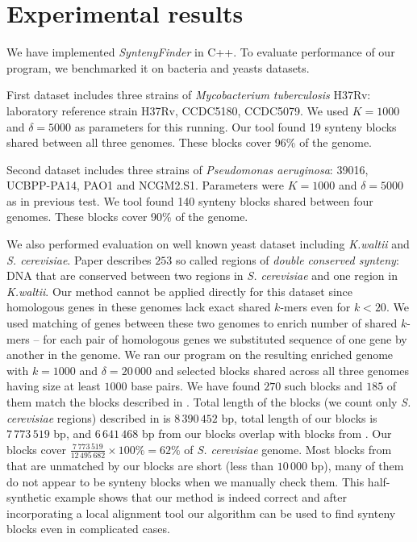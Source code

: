 \documentclass[a4paper, 12pt]{scrartcl}
\begin{document}
\section{Experimental results}
We have implemented \textit{SyntenyFinder} in C++. To evaluate performance of our program, we benchmarked it on bacteria and yeasts datasets.

First dataset includes three strains of \textit{Mycobacterium tuberculosis} H37Rv: laboratory reference strain H37Rv,
CCDC5180, CCDC5079. We used \(K = 1000\) and \(\delta = 5000\) as parameters for this running. Our tool found
19 synteny blocks shared between all three genomes. These blocks cover 96\% of the genome.

Second dataset includes three strains of \textit{Pseudomonas aeruginosa}: 39016, UCBPP-PA14, PAO1 and NCGM2.S1.
Parameters were \(K = 1000\) and \(\delta = 5000\) as in previous test. We tool found 140 synteny blocks shared between four genomes. 
These blocks cover 90\% of the genome.

We also performed evaluation on well known yeast dataset including \textit{K.waltii} and \textit{S. cerevisiae}. Paper \cite{Kellis2004} describes
\(253\) so called regions of \textit{double conserved synteny}: DNA that are conserved between two regions in \textit{S. cerevisiae} and one region in \textit{K.waltii}.
Our method cannot be applied directly for this dataset since homologous genes in these genomes lack exact shared \(k\)-mers even for \(k < 20\). We used
matching of genes between these two genomes to enrich number of shared \(k\)-mers -- for each pair of homologous genes we substituted sequence of one
gene by another in the genome. We ran our program on the resulting enriched genome with \(k = 1000\) and \(\delta = 20 \,000\) and selected blocks shared
across all three genomes having size at least \(1 000\) base pairs. We have found \(270\) such blocks and \(185\) of them match the blocks described in \cite{Kellis2004}.
Total length of the blocks (we count only \textit{S. cerevisiae} regions) described in \cite{Kellis2004} is \(8  \, 390  \, 452\) bp, total length of our blocks is \(7 \, 773 \, 519\) bp, and \(6 \, 641 \, 468\) bp
from our blocks overlap with blocks from \cite{Kellis2004}. Our blocks cover  \(\frac{7 \, 773 \, 519}{12 \, 495 \, 682} \times 100 \% = 62\% \) of \textit{S. cerevisiae} genome. Most
blocks from \cite{Kellis2004} that are unmatched by our blocks are short (less than \(10 \, 000\) bp), many of them do not appear to be
synteny blocks when we manually check them. This half-synthetic example shows that
our method is indeed correct and after incorporating a local alignment tool our algorithm can be used to find synteny blocks even in complicated cases.
\end{document}
